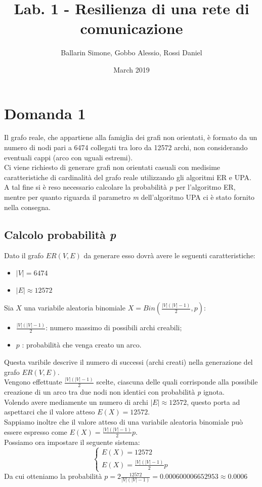 \documentclass{article}
\title{Lab. 1 - Resilienza di una rete di comunicazione}
\author{Ballarin Simone, Gobbo Alessio, Rossi Daniel}
\date{March 2019}
\begin{document}
\maketitle

\section*{Domanda 1}
Il grafo reale, che appartiene alla famiglia dei grafi non orientati, è formato da un numero di nodi pari a 6474 collegati tra loro da 12572 archi, non considerando eventuali cappi (arco con uguali estremi).\\
Ci viene richiesto di generare grafi non orientati casuali con medisime caratteristiche di cardinalità del grafo reale utilizzando gli algoritmi ER e UPA.\\
A tal fine si è reso necessario calcolare la probabilità \textit{p} per l'algoritmo ER, mentre per quanto riguarda il parametro \textit{m} dell'algoritmo UPA ci è stato fornito nella consegna.
\subsection*{Calcolo probabilità \textit{p}}
Dato il grafo $ER(V,E)$ da generare esso dovrà avere le seguenti caratteristiche:
\begin{itemize}
	\item $|V|= 6474$
	\item $|E| \approx 12572$
\end{itemize}
Sia $X$ una variabile aleatoria binomiale $X=Bin(\frac{|V|(|V|-1)}{2},p)$:
\begin{itemize}
	\item $\frac{|V|(|V|-1)}{2}$: numero massimo di possibili archi creabili;
	\item $p$ : probabilità che venga creato un arco.
\end{itemize} 
Questa varibile descrive il numero di successi (archi creati) nella generazione del grafo $ER(V,E)$.\\
Vengono effettuate $\frac{|V|(|V|-1)}{2}$ scelte, ciascuna delle quali corrisponde alla possibile creazione di un arco tra due nodi non identici con probabilità \textit{p} ignota.\\
Volendo avere mediamente un numero di archi $|E| \approx 12572$, questo porta ad aspettarci che il valore atteso $E(X) = 12572$.\\
Sappiamo inoltre che il valore atteso di una variabile aleatoria binomiale può essere espresso come  $E(X)=\frac{|V|(|V|-1)}{2}p$.\\
Possiamo ora impostare il seguente sistema:
$$
\begin{cases}
	E(X) = 12572               \\ 
	E(X)=\frac{|V|(|V|-1)}{2}p 
\end{cases}
$$
Da cui otteniamo la probabilità $p = 2\frac{12572}{|V|(|V|-1)} = 0.000600006652953 \approx 0.0006$
\end{document}
